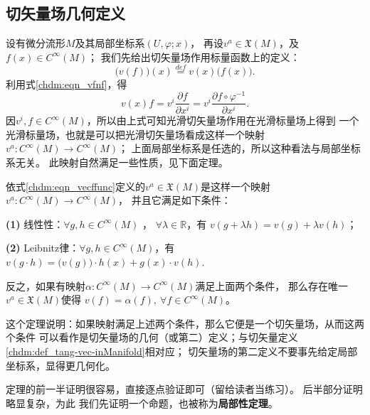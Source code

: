 \subsection{切矢量场几何定义}\label{chdm:sec_vdef2}
设有微分流形$M$及其局部坐标系$(U,\varphi;x)$，
再设$v^a\in \mathfrak{X}(M)$，及$f(x) \in C^\infty(M)$；
我们先给出切矢量场作用标量函数上的定义：
\begin{equation}\label{chdm:eqn_vecffunc}
    \bigl(v(f)\bigr) (x)  \overset{def}{=}  v(x) \bigl( f(x)\bigr) .
\end{equation}
利用式\eqref{chdm:eqn_vfnf}，得
\begin{equation}
    v(x) f = v^i \frac{\partial f }{\partial x^i} = 
    v^i \frac{\partial f\circ \varphi^{-1} }{\partial x^i}.
\end{equation}
因$v^i, f \in C^\infty(M)$，所以由上式可知光滑切矢量场作用在光滑标量场上得到
一个光滑标量场，也就是可以把光滑切矢量场看成这样一个映射$v^a:C^\infty(M)\to C^\infty(M)$；
上面局部坐标系是任选的，所以这种看法与局部坐标系无关。
此映射自然满足一些性质，见下面定理。



\begin{theorem}\label{chdm:thm_vf-def2}
    依式\eqref{chdm:eqn_vecffunc}定义的$v^a\in \mathfrak{X}(M)$是这样一个映射$v^a:C^\infty(M)\to C^\infty(M)$，
    并且它满足如下条件：

    {\bfseries (1)} 线性性：$\forall g,h \in C^\infty(M) $ ， $\forall \lambda \in \mathbb{R}$，有
    $v (g+\lambda h) = v (g)+ \lambda v (h) $；

    {\bfseries (2)} Leibnitz律：$\forall g,h \in C^\infty(M) $，有
    $v (g\cdot h) = \bigl(v(g)\bigr)\cdot h(x)+ g(x)\cdot v (h) .$
    
    反之，如果有映射$\alpha:C^\infty(M)\to C^\infty(M) $满足上面两个条件，
    那么存在唯一$v^a\in \mathfrak{X}(M)$使得
    $v(f)=\alpha(f),\ \forall f\in C^\infty(M)$。
\end{theorem}
这个定理说明：如果映射满足上述两个条件，那么它便是一个切矢量场，从而这两个条件
可以看作是切矢量场的几何（或第二）定义；与切矢量定义\ref{chdm:def_tang-vec-inManifold}相对应；
切矢量场的第二定义不要事先给定局部坐标系，显得更几何化。

定理的前一半证明很容易，直接逐点验证即可（留给读者当练习）。
后半部分证明略显复杂，为此
我们先证明一个命题，也被称为\textbf{局部性定理}。


